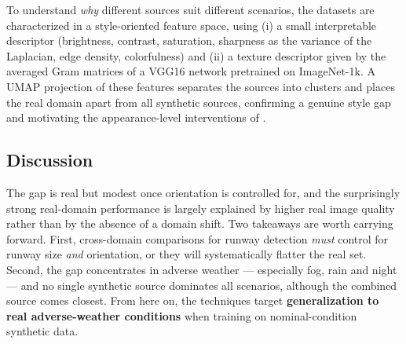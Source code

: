 To understand \emph{why} different sources suit different scenarios, the datasets are
characterized in a style-oriented feature space, using (i) a small interpretable
descriptor (brightness, contrast, saturation, sharpness as the variance of the
Laplacian, edge density, colorfulness) and (ii) a texture descriptor given by the
averaged Gram matrices of a VGG16 network pretrained on ImageNet-1k. A UMAP projection
of these features separates the sources into clusters and places the real domain apart
from all synthetic sources, confirming a genuine style gap and motivating the
appearance-level interventions of .


\subsection{Discussion}
\label{subsec:gap-discussion}
The gap is real but modest once orientation is controlled for, and the surprisingly
strong real-domain performance is largely explained by higher real image quality
rather than by the absence of a domain shift. Two takeaways are worth carrying
forward. First, cross-domain comparisons for runway detection \emph{must} control for runway
size \emph{and} orientation, or they will systematically flatter the real set.
Second, the gap concentrates in adverse weather --- especially fog, rain and night ---
and no single synthetic source dominates all scenarios, although the combined source
comes closest. From here on, the techniques target \textbf{generalization to real
adverse-weather conditions} when training on nominal-condition synthetic data.
